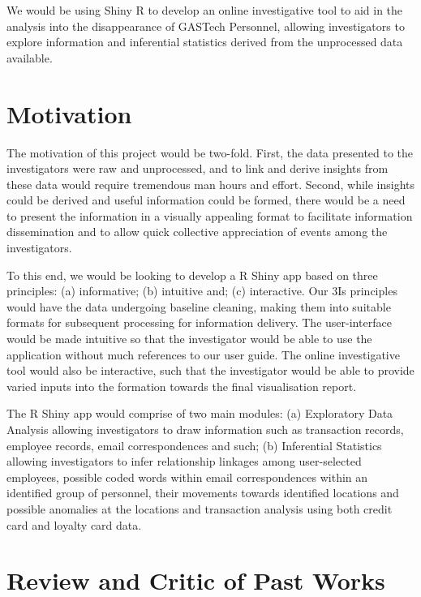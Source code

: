 \documentclass{acm_proc_article-sp}
\begin{document}
We would be using Shiny R to develop an online investigative tool to aid
in the analysis into the disappearance of GASTech Personnel, allowing
investigators to explore information and inferential statistics derived
from the unprocessed data available.

\hypertarget{motivation}{%
\section{Motivation}\label{motivation}}

The motivation of this project would be two-fold. First, the data
presented to the investigators were raw and unprocessed, and to link and
derive insights from these data would require tremendous man hours and
effort. Second, while insights could be derived and useful information
could be formed, there would be a need to present the information in a
visually appealing format to facilitate information dissemination and to
allow quick collective appreciation of events among the investigators.

To this end, we would be looking to develop a R Shiny app based on three
principles: (a) informative; (b) intuitive and; (c) interactive. Our 3Is
principles would have the data undergoing baseline cleaning, making them
into suitable formats for subsequent processing for information
delivery. The user-interface would be made intuitive so that the
investigator would be able to use the application without much
references to our user guide. The online investigative tool would also
be interactive, such that the investigator would be able to provide
varied inputs into the formation towards the final visualisation report.

The R Shiny app would comprise of two main modules: (a) Exploratory Data
Analysis allowing investigators to draw information such as transaction
records, employee records, email correspondences and such; (b)
Inferential Statistics allowing investigators to infer relationship
linkages among user-selected employees, possible coded words within
email correspondences within an identified group of personnel, their
movements towards identified locations and possible anomalies at the
locations and transaction analysis using both credit card and loyalty
card data.

\hypertarget{review-and-critic-of-past-works}{%
\section{Review and Critic of Past
Works}\label{review-and-critic-of-past-works}}
\end{document}
